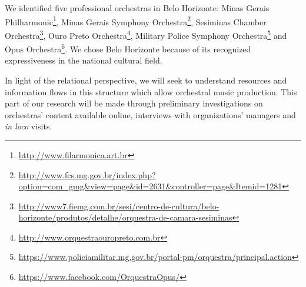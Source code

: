 \documentclass[a4paper, 12pt, openright, oneside, german, french, brazil, english, article]{abntex2}
\begin{document}
	We identified five professional orchestras in Belo Horizonte: Minas Gerais Philharmonic\footnote{\url{http://www.filarmonica.art.br}}, Minas Gerais Symphony Orchestra\footnote{\url{http://www.fcs.mg.gov.br/index.php?option=com_gmg&view=page&id=2631&controller=page&Itemid=1281}}, Sesiminas Chamber Orchestra\footnote{\url{http://www7.fiemg.com.br/sesi/centro-de-cultura/belo-horizonte/produtos/detalhe/orquestra-de-camara-sesiminas}}, Ouro Preto Orchestra\footnote{\url{http://www.orquestraouropreto.com.br}}, Military Police Symphony Orchestra\footnote{\url{https://www.policiamilitar.mg.gov.br/portal-pm/orquestra/principal.action}} and Opus Orchestra\footnote{\url{https://www.facebook.com/OrquestraOpus/}}. We chose	Belo Horizonte because of its recognized expressiveness in the national cultural field.
	
	
	In light of the relational perspective, we will seek to understand resources and information flows in this structure which allow orchestral music production. This part of our research will be made through preliminary investigations on orchestras' content available online, interviews with organizations' managers and \textit{in loco} visits.
	
\end{document}
